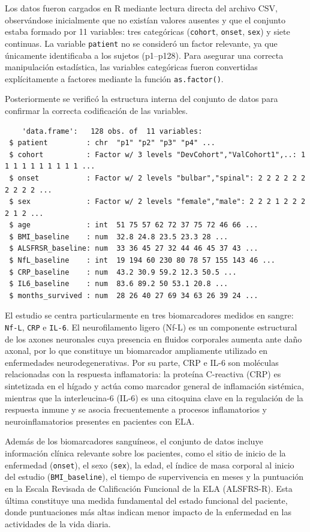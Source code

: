 \documentclass[12pt]{article} %
\begin{document}
Los datos fueron cargados en R mediante lectura directa del archivo CSV, observándose inicialmente que no existían valores ausentes y que el conjunto estaba formado por 11 variables: tres categóricas (\texttt{cohort}, \texttt{onset}, \texttt{sex}) y siete continuas. La variable \texttt{patient} no se consideró un factor relevante, ya que únicamente identificaba a los sujetos (p1--p128). Para asegurar una correcta manipulación estadística, las variables categóricas fueron convertidas explícitamente a factores mediante la función \texttt{as.factor()}.

Posteriormente se verificó la estructura interna del conjunto de datos para confirmar la correcta codificación de las variables.

\begin{verbatim}
    'data.frame':	128 obs. of  11 variables:
 $ patient         : chr  "p1" "p2" "p3" "p4" ...
 $ cohort          : Factor w/ 3 levels "DevCohort","ValCohort1",..: 1 1 1 1 1 1 1 1 1 1 ...
 $ onset           : Factor w/ 2 levels "bulbar","spinal": 2 2 2 2 2 2 2 2 2 2 ...
 $ sex             : Factor w/ 2 levels "female","male": 2 2 2 1 2 2 2 2 1 2 ...
 $ age             : int  51 75 57 62 72 37 75 72 46 66 ...
 $ BMI_baseline    : num  32.8 24.8 23.5 23.3 28 ...
 $ ALSFRSR_baseline: num  33 36 45 27 32 44 46 45 37 43 ...
 $ NfL_baseline    : int  19 194 60 230 80 78 57 155 143 46 ...
 $ CRP_baseline    : num  43.2 30.9 59.2 12.3 50.5 ...
 $ IL6_baseline    : num  83.6 89.2 50 53.1 20.8 ...
 $ months_survived : num  28 26 40 27 69 34 63 26 39 24 ...
\end{verbatim}

El estudio se centra particularmente en tres biomarcadores medidos en sangre: \texttt{Nf-L}, \texttt{CRP} e \texttt{IL-6}. El neurofilamento ligero (Nf-L) es un componente estructural de los axones neuronales cuya presencia en fluidos corporales aumenta ante daño axonal, por lo que constituye un biomarcador ampliamente utilizado en enfermedades neurodegenerativas. Por su parte, CRP e IL-6 son moléculas relacionadas con la respuesta inflamatoria: la proteína C-reactiva (CRP) es sintetizada en el hígado y actúa como marcador general de inflamación sistémica, mientras que la interleucina-6 (IL-6) es una citoquina clave en la regulación de la respuesta inmune y se asocia frecuentemente a procesos inflamatorios y neuroinflamatorios presentes en pacientes con ELA.

Además de los biomarcadores sanguíneos, el conjunto de datos incluye información clínica relevante sobre los pacientes, como el sitio de inicio de la enfermedad (\texttt{onset}), el sexo (\texttt{sex}), la edad, el índice de masa corporal al inicio del estudio (\texttt{BMI\_baseline}), el tiempo de supervivencia en meses y la puntuación en la Escala Revisada de Calificación Funcional de la ELA (ALSFRS-R). Esta última constituye una medida fundamental del estado funcional del paciente, donde puntuaciones más altas indican menor impacto de la enfermedad en las actividades de la vida diaria.
\end{document}
